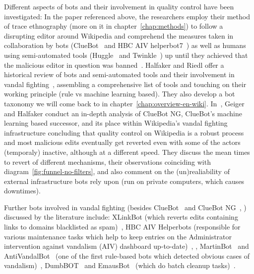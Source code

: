 Different aspects of bots and their involvement in quality control have been investigated:
In the paper referenced above, the researchers employ their method of trace ethnography (more on it in chapter~\ref{chap:methods}) to follow a disrupting editor around Wikipedia and comprehend the measures taken in collaboration by bots (ClueBot~\cite{Wikipedia:ClueBot} and HBC AIV helperbot7~\cite{Wikipedia:HBCAIVHelperbot}) as well as humans using semi-automated tools (Huggle~\cite{Wikipedia:Huggle} and Twinkle~\cite{Wikipedia:Twinkle}) up until they achieved that the malicious editor in question was banned~\cite{GeiRib2010}.
Halfaker and Riedl offer a historical review of bots and semi-automated tools and their involvement in vandal fighting~\cite{HalRied2012}, assembling a comprehensive list of tools and touching on their working principle (rule vs machine learning based).
They also develop a bot taxonomy we will come back to in chapter~\ref{chap:overview-en-wiki}. %
In~\cite{GeiHal2013}, Geiger and Halfaker conduct an in-depth analysis of ClueBot NG, ClueBot's machine learning based successor, and its place within Wikipedia's vandal fighting infrastructure concluding that quality control on Wikipedia is a robust process and most malicious edits eventually get reverted even with some of the actors (temporaly) inactive, although at a different speed.
They discuss the mean times to revert of different mechanisms, their observations coinciding with diagram~\ref{fig:funnel-no-filters},
and also comment on the (un)realiability of external infrastructure bots rely upon (run on private computers, which causes downtimes).

Further bots involved in vandal fighting (besides ClueBot~\cite{GeiRib2010} and ClueBot NG~\cite{GeiHal2013}, \cite{HalRied2012}) discussed by the literature include:
XLinkBot (which reverts edits containing links to domains blacklisted as spam)~\cite{HalRied2012},
HBC AIV Helperbots (responsible for various maintenance tasks which help to keep entries on the Administrator intervention against vandalism (AIV) dashboard up-to-date)~\cite{HalRied2012}, \cite{GeiRib2010},
MartinBot~\cite{Wikipedia:MartinBot} and AntiVandalBot~\cite{Wikipedia:AntiVandalBot} (one of the first rule-based bots which detected obvious cases of vandalism)~\cite{HalRied2012},
DumbBOT~\cite{Wikipedia:DumbBOT} and EmausBot~\cite{Wikipedia:EmausBot} (which do batch cleanup tasks)~\cite{GeiHal2013}.

